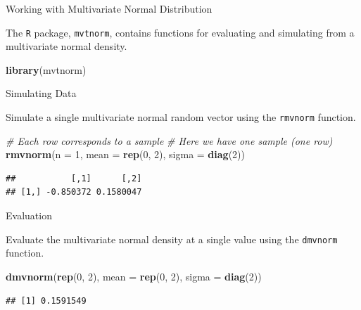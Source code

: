 \documentclass[
  ignorenonframetext,
]{beamer}
\newenvironment{Shaded}{\begin{snugshade}}{\end{snugshade}}
\newcommand{\CommentTok}[1]{\textcolor[rgb]{0.56,0.35,0.01}{\textit{#1}}}
\newcommand{\DataTypeTok}[1]{\textcolor[rgb]{0.13,0.29,0.53}{#1}}
\newcommand{\DecValTok}[1]{\textcolor[rgb]{0.00,0.00,0.81}{#1}}
\newcommand{\KeywordTok}[1]{\textcolor[rgb]{0.13,0.29,0.53}{\textbf{#1}}}
\newcommand{\NormalTok}[1]{#1}
\begin{document}
\begin{frame}[fragile]{Working with Multivariate Normal Distribution}
\protect\hypertarget{working-with-multivariate-normal-distribution}{}

The \texttt{R} package, \texttt{mvtnorm}, contains functions for
evaluating and simulating from a multivariate normal density.

\begin{Shaded}
\begin{Highlighting}[]
\KeywordTok{library}\NormalTok{(mvtnorm)}
\end{Highlighting}
\end{Shaded}

\end{frame}

\begin{frame}[fragile]{Simulating Data}
\protect\hypertarget{simulating-data}{}

Simulate a single multivariate normal random vector using the
\texttt{rmvnorm} function.

\begin{Shaded}
\begin{Highlighting}[]
\CommentTok{# Each row corresponds to a sample}
\CommentTok{# Here we have one sample (one row)}
\KeywordTok{rmvnorm}\NormalTok{(}\DataTypeTok{n =} \DecValTok{1}\NormalTok{, }\DataTypeTok{mean =} \KeywordTok{rep}\NormalTok{(}\DecValTok{0}\NormalTok{, }\DecValTok{2}\NormalTok{), }\DataTypeTok{sigma =} \KeywordTok{diag}\NormalTok{(}\DecValTok{2}\NormalTok{))}
\end{Highlighting}
\end{Shaded}

\begin{verbatim}
##           [,1]      [,2]
## [1,] -0.850372 0.1580047
\end{verbatim}

\end{frame}

\begin{frame}[fragile]{Evaluation}
\protect\hypertarget{evaluation}{}

Evaluate the multivariate normal density at a single value using the
\texttt{dmvnorm} function.

\begin{Shaded}
\begin{Highlighting}[]
\KeywordTok{dmvnorm}\NormalTok{(}\KeywordTok{rep}\NormalTok{(}\DecValTok{0}\NormalTok{, }\DecValTok{2}\NormalTok{), }\DataTypeTok{mean =} \KeywordTok{rep}\NormalTok{(}\DecValTok{0}\NormalTok{, }\DecValTok{2}\NormalTok{), }\DataTypeTok{sigma =} \KeywordTok{diag}\NormalTok{(}\DecValTok{2}\NormalTok{))}
\end{Highlighting}
\end{Shaded}

\begin{verbatim}
## [1] 0.1591549
\end{verbatim}

\end{frame}
\end{document}
